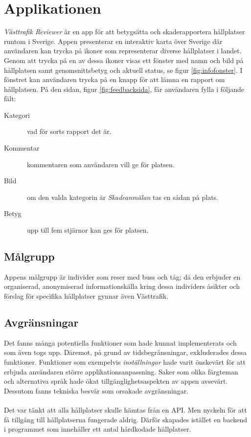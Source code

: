 \documentclass{article}
\begin{document}
\section*{Applikationen}
\textit{Västtrafik Reviewer} är en app för att betygsätta och skaderapportera hållplatser runtom i Sverige. Appen presenterar en interaktiv karta över Sverige där användaren kan trycka på ikoner som representerar diverse hållplatser i landet. Genom att trycka på en av dessa ikoner visas ett fönster med namn och bild på hållplatsen samt genomsnittsbetyg och aktuell status, se figur \ref{fig:infofonster}. I fönstret kan användaren trycka på en knapp för att lämna en rapport om hållplatsen. På den sidan, figur \ref{fig:feedbacksida}, får användaren fylla i följande fält:
\begin{description}
\item[Kategori] \textendash\ vad för sorts rapport det är.
\item[Kommentar] \textendash\ kommentaren som användaren vill ge för platsen.
\item[Bild] \textendash\ om den valda kategorin är \textit{Skadeanmälan} tas en sådan på plats.
\item[Betyg] \textendash\ upp till fem stjärnor kan ges för platsen.
\end{description}

\subsection*{Målgrupp}
Appens målgrupp är individer som reser med buss och tåg; då den erbjuder en organiserad, anonymiserad informationskälla kring dessa individers åsikter och förslag för specifika hållplatser gynnar även Västtrafik. 

\subsection*{Avgränsningar}
Det fanns många potentiella funktioner som hade kunnat implementerats och som även togs upp. Däremot, på grund av tidsbegränsningar, exkluderades dessa funktioner. Funktioner som exempelvis \textit{inställningar} hade varit önskevärt för att erbjuda användaren större applikationsanpassning. Saker som olika färgteman och alternativa språk hade ökat tillgänglighetsaspekten av appen avsevärt. Dessutom fanns tekniska besvär som orsakade avgränsningar.
\\\\
Det var tänkt att alla hållplatser skulle hämtas från en API. Men nyckeln för att få tillgång till hållplatserna fungerade aldrig. Därför skapades istället en backend i programmet som innehåller ett antal hårdkodade hållplatser. 
\end{document}
